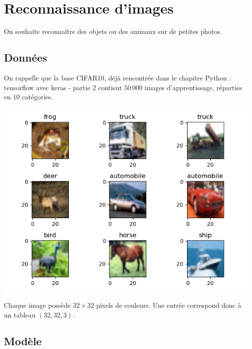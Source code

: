 \documentclass[11pt,class=report,crop=false]{standalone}
\begin{document}
\section{Reconnaissance d'images}

On souhaite reconnaître des objets ou des animaux sur de petites photos.

\subsection{Données}

On rappelle que la base CIFAR10, déjà rencontrée dans le chapitre \og{}Python : tensorflow avec keras - partie 2\fg{} contient $50\,000$ images d'apprentissage, réparties en $10$ catégories.

\begin{center}
\includegraphics[scale=\myscale,scale=0.7]{figures/tfconv-images-train}
\end{center}

Chaque image possède $32\times 32$ pixels de couleurs. Une entrée correspond donc à un tableau
$(32,32,3)$.


\subsection{Modèle}
\end{document}
